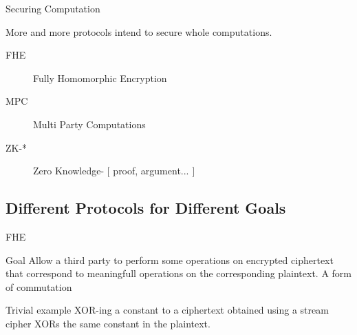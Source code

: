 \documentclass[presentation,aspectratio=1610]{beamer}
\begin{document}
\begin{frame}{Securing Computation}
  \begin{center}
    {\Large More and more protocols intend to secure whole \alert{computations}.}

    \vspace{0.8cm}
    
    \begin{description}
    \item[FHE] \alert{F}ully \alert{H}omomorphic \alert{E}ncryption
    \item[MPC] \alert{M}ulti \alert{P}arty \alert{C}omputations
    \item[ZK-*] \alert{Z}ero \alert{K}nowledge- $[$ proof, argument... $]$
    \end{description}
  \end{center}
\end{frame}


\subsection{Different Protocols for Different Goals}

\begin{frame}{FHE}
  \begin{exampleblock}{Goal}
    Allow a third party to perform some operations on encrypted ciphertext that correspond to meaningfull operations on the corresponding plaintext. \hfill \pause \alert{A form of commutation}    
  \end{exampleblock}

  \pause

  \begin{center}
  \end{center}

  \pause

  \begin{alertblock}{Trivial example}
    XOR-ing a constant to a ciphertext obtained using a stream cipher XORs the same constant in the plaintext.
  \end{alertblock}
\end{frame}
\end{document}
